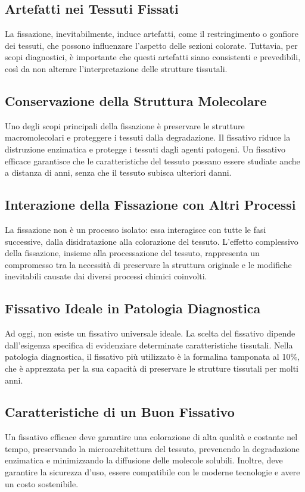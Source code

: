 \subsection{Artefatti nei Tessuti Fissati}
La fissazione, inevitabilmente, induce artefatti, come il restringimento o gonfiore dei tessuti, che possono influenzare l’aspetto delle sezioni colorate. Tuttavia, per scopi diagnostici, è importante che questi artefatti siano consistenti e prevedibili, così da non alterare l'interpretazione delle strutture tissutali.

\subsection{Conservazione della Struttura Molecolare}
Uno degli scopi principali della fissazione è preservare le strutture macromolecolari e proteggere i tessuti dalla degradazione. Il fissativo riduce la distruzione enzimatica e protegge i tessuti dagli agenti patogeni. Un fissativo efficace garantisce che le caratteristiche del tessuto possano essere studiate anche a distanza di anni, senza che il tessuto subisca ulteriori danni.

\subsection{ Interazione della Fissazione con Altri Processi}
La fissazione non è un processo isolato: essa interagisce con tutte le fasi successive, dalla disidratazione alla colorazione del tessuto. L’effetto complessivo della fissazione, insieme alla processazione del tessuto, rappresenta un compromesso tra la necessità di preservare la struttura originale e le modifiche inevitabili causate dai diversi processi chimici coinvolti.

\subsection{Fissativo Ideale in Patologia Diagnostica}
Ad oggi, non esiste un fissativo universale ideale. La scelta del fissativo dipende dall’esigenza specifica di evidenziare determinate caratteristiche tissutali. Nella patologia diagnostica, il fissativo più utilizzato è la formalina tamponata al 10\%, che è apprezzata per la sua capacità di preservare le strutture tissutali per molti anni.

\subsection{Caratteristiche di un Buon Fissativo}
Un fissativo efficace deve garantire una colorazione di alta qualità e costante nel tempo, preservando la microarchitettura del tessuto, prevenendo la degradazione enzimatica e minimizzando la diffusione delle molecole solubili. Inoltre, deve garantire la sicurezza d'uso, essere compatibile con le moderne tecnologie e avere un costo sostenibile.

